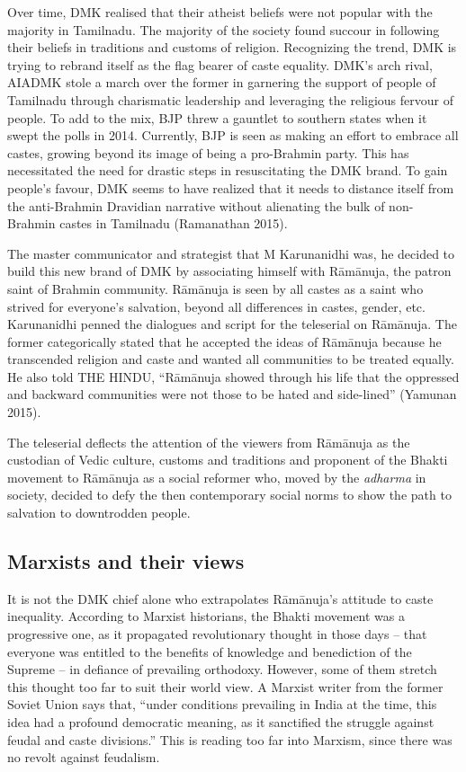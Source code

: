 Over time, DMK realised that their atheist beliefs were not popular with the majority in Tamilnadu. The majority of the society found succour in following their beliefs in traditions and customs of religion. Recognizing the trend, DMK is trying to rebrand itself as the flag bearer of caste equality. DMK’s arch rival, AIADMK stole a march over the former in garnering the support of people of Tamilnadu through charismatic leadership and leveraging the religious fervour of people. To add to the mix, BJP threw a gauntlet to southern states when it swept the polls in 2014. Currently, BJP is seen as making an effort to embrace all castes, growing beyond its image of being a pro-Brahmin party. This has necessitated the need for drastic steps in resuscitating the DMK brand. To gain people’s favour, DMK seems to have realized that it needs to distance itself from the anti-Brahmin Dravidian narrative without alienating the bulk of non-Brahmin castes in Tamilnadu (Ramanathan 2015).

The master communicator and strategist that M Karunanidhi was, he decided to build this new brand of DMK by associating himself with Rāmānuja, the patron saint of Brahmin community. Rāmānuja is seen by all castes as a saint who strived for everyone’s salvation, beyond all differences in castes, gender, etc. Karunanidhi penned the dialogues and script for the teleserial on Rāmānuja. The former categorically stated that he accepted the ideas of Rāmānuja because he transcended religion and caste and wanted all communities to be treated equally. He also told THE HINDU, “Rāmānuja showed through his life that the oppressed and backward communities were not those to be hated and side-lined” (Yamunan 2015).

The teleserial deflects the attention of the viewers from Rāmānuja as the custodian of Vedic culture, customs and traditions and proponent of the Bhakti movement to Rāmānuja as a social reformer who, moved by the \textit{adharma} in society, decided to defy the then contemporary social norms to show the path to salvation to downtrodden people.


\subsection*{Marxists and their views}

It is not the DMK chief alone who extrapolates Rāmānuja’s attitude to caste inequality. According to Marxist historians, the Bhakti movement was a progressive one, as it propagated revolutionary thought in those days – that everyone was entitled to the benefits of knowledge and benediction of the Supreme – in defiance of prevailing orthodoxy. However, some of them stretch this thought too far to suit their world view. A Marxist writer from the former Soviet Union says that, “under conditions prevailing in India at the time, this idea had a profound democratic meaning, as it sanctified the struggle against feudal and caste divisions.” This is reading too far into Marxism, since there was no revolt against feudalism.


